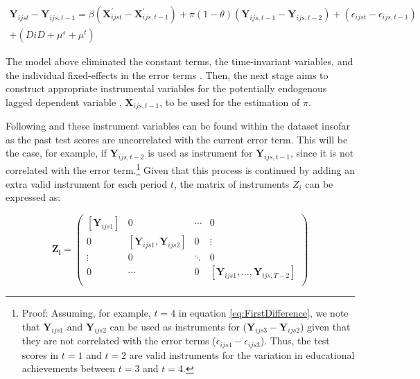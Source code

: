 \documentclass[a4paper, 12pt]{article}
\begin{document}
{\begin{multline} \label{eq:FirstDifference}
\mathbf{Y}_{ijst} - \mathbf{Y}_{ijs,t-1} = \beta (\mathbf{X}_{ijst}^{\prime} - \mathbf{X}_{ijs,t-1}^{\prime}) + \pi (1 - \theta) (\mathbf{Y}_{ijs,t-1} - \mathbf{Y}_{ijs,t-2}) + (\epsilon_{ijst} - \epsilon_{ijs,t-1}) \\ + (DiD + \mu^{s} + \mu^{t})
\end{multline}


The model above eliminated the constant terms, the time-invariant variables, and the individual fixed-effects in the error terms \citep{wooldridge2016introductory}. Then, the next stage aims to construct appropriate instrumental variables for the potentially endogenous lagged dependent variable , $\mathbf{X}_{ijs,t-1}$, to be used for the estimation of $\pi$. 




Following \citet{habimana2017flexible} and \citet{roodman2009xtabond2} these instrument variables can be found within the dataset insofar as the past test scores are uncorrelated with the current error term. This will be the case, for example, if $\mathbf{Y}_{ijs,t-2}$ is used as instrument for $\mathbf{Y}_{ijs,t-1}$, since it is not correlated with the error term.\footnote{Proof: Assuming, for example, $t=4$ in equation \eqref{eq:FirstDifference}, we note that $\mathbf{Y}_{ijs1}$ and $\mathbf{Y}_{ijs2}$ can be used as instruments for ($\mathbf{Y}_{ijs3} - \mathbf{Y}_{ijs2}$) given that they are not correlated with the error terms ($\epsilon_{ijs4} - \epsilon_{ijs3}$). Thus, the test scores in $t=1$ and $t=2$ are valid instruments for the variation in educational achievements between $t=3$ and $t=4$.} Given that this process is continued by adding an extra valid instrument for each period $t$, the matrix of instruments $Z_i$ can be expressed as: 




\begin{equation} \label{eq:Matrix}
\mathbf{Z_i} = \left( \begin{array}{cccc}
[\mathbf{Y}_{ijs1}] & 0 & \cdots & 0 \\
0 & [\mathbf{Y}_{ijs1}, \mathbf{Y}_{ijs2}] & 0 & \vdots \\
\vdots & 0 & \ddots & 0 \\
0 & \cdots & 0 & [\mathbf{Y}_{ijs1}, \dotsc, \mathbf{Y}_{ijs,T-2}] \\
\end{array}\right) 
\end{equation}

}
\end{document}
